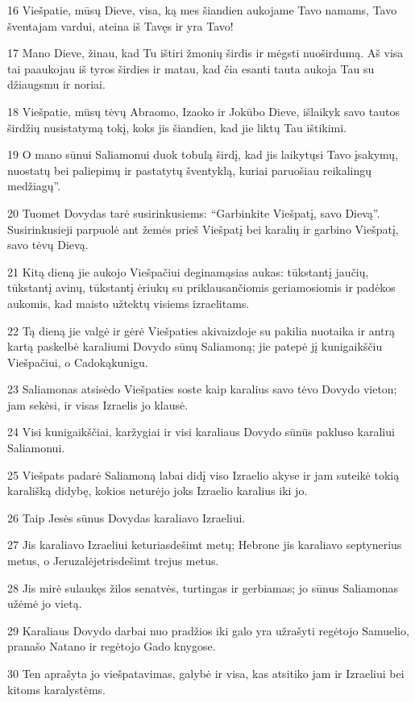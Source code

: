 \par 16 Viešpatie, mūsų Dieve, visa, ką mes šiandien aukojame Tavo namams, Tavo šventajam vardui, ateina iš Tavęs ir yra Tavo! 
\par 17 Mano Dieve, žinau, kad Tu ištiri žmonių širdis ir mėgsti nuoširdumą. Aš visa tai paaukojau iš tyros širdies ir matau, kad čia esanti tauta aukoja Tau su džiaugsmu ir noriai. 
\par 18 Viešpatie, mūsų tėvų Abraomo, Izaoko ir Jokūbo Dieve, išlaikyk savo tautos širdžių nusistatymą tokį, koks jis šiandien, kad jie liktų Tau ištikimi. 
\par 19 O mano sūnui Saliamonui duok tobulą širdį, kad jis laikytųsi Tavo įsakymų, nuostatų bei paliepimų ir pastatytų šventyklą, kuriai paruošiau reikalingų medžiagų”. 
\par 20 Tuomet Dovydas tarė susirinkusiems: “Garbinkite Viešpatį, savo Dievą”. Susirinkusieji parpuolė ant žemės prieš Viešpatį bei karalių ir garbino Viešpatį, savo tėvų Dievą. 
\par 21 Kitą dieną jie aukojo Viešpačiui deginamąsias aukas: tūkstantį jaučių, tūkstantį avinų, tūkstantį ėriukų su priklausančiomis geriamosiomis ir padėkos aukomis, kad maisto užtektų visiems izraelitams. 
\par 22 Tą dieną jie valgė ir gėrė Viešpaties akivaizdoje su pakilia nuotaika ir antrą kartą paskelbė karaliumi Dovydo sūnų Saliamoną; jie patepė jį kunigaikščiu Viešpačiui, o Cadoką­kunigu. 
\par 23 Saliamonas atsisėdo Viešpaties soste kaip karalius savo tėvo Dovydo vieton; jam sekėsi, ir visas Izraelis jo klausė. 
\par 24 Visi kunigaikščiai, karžygiai ir visi karaliaus Dovydo sūnūs pakluso karaliui Saliamonui. 
\par 25 Viešpats padarė Saliamoną labai didį viso Izraelio akyse ir jam suteikė tokią karališką didybę, kokios neturėjo joks Izraelio karalius iki jo. 
\par 26 Taip Jesės sūnus Dovydas karaliavo Izraeliui. 
\par 27 Jis karaliavo Izraeliui keturiasdešimt metų; Hebrone jis karaliavo septynerius metus, o Jeruzalėje­trisdešimt trejus metus. 
\par 28 Jis mirė sulaukęs žilos senatvės, turtingas ir gerbiamas; jo sūnus Saliamonas užėmė jo vietą. 
\par 29 Karaliaus Dovydo darbai nuo pradžios iki galo yra užrašyti regėtojo Samuelio, pranašo Natano ir regėtojo Gado knygose. 
\par 30 Ten aprašyta jo viešpatavimas, galybė ir visa, kas atsitiko jam ir Izraeliui bei kitoms karalystėms.



